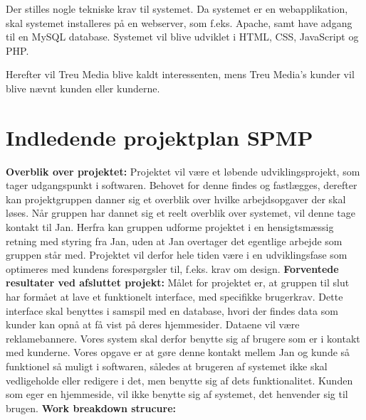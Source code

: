 \documentclass[a4paper,12pt]{article}
\begin{document}
Der stilles nogle tekniske krav til systemet. Da systemet er en webapplikation, skal systemet installeres på en webserver, som f.eks. Apache, samt have adgang til en MySQL database. Systemet vil blive udviklet i HTML, CSS, JavaScript og PHP.

Herefter vil Treu Media blive kaldt interessenten, mens Treu Media's kunder vil blive nævnt kunden eller kunderne.

\section{Indledende projektplan SPMP}

\textbf{Overblik over projektet:}
\newline
Projektet vil være et løbende udviklingsprojekt, som tager udgangspunkt i softwaren. Behovet for denne findes og fastlægges, derefter kan projektgruppen danner sig et overblik over hvilke arbejdsopgaver der skal løses. Når gruppen har dannet sig et reelt overblik over systemet, vil denne tage kontakt til Jan. Herfra kan gruppen udforme projektet i en hensigtsmæssig retning med styring fra Jan, uden at Jan overtager det egentlige arbejde som gruppen står med. Projektet vil derfor hele tiden være i en udviklingsfase som optimeres med kundens forespørgsler til, f.eks. krav om design.
\newline
\newline
\textbf{Forventede resultater ved afsluttet projekt:}
\newline
Målet for projektet er, at gruppen til slut har formået at lave et funktionelt interface, med specifikke brugerkrav. Dette interface skal benyttes i samspil med en database, hvori der findes data som kunder kan opnå at få vist på deres hjemmesider. Dataene vil være reklamebannere. Vores system skal derfor benytte sig af brugere som er i kontakt med kunderne. 
Vores opgave er at gøre denne kontakt mellem Jan og kunde så funktionel så muligt i softwaren, således at brugeren af systemet ikke skal vedligeholde eller redigere i det, men benytte sig af dets funktionalitet. Kunden som eger en hjemmeside, vil ikke benytte sig af systemet, det henvender sig til brugen.
\newline
\newline
\textbf{Work breakdown strucure:}
\newline
\end{document}
